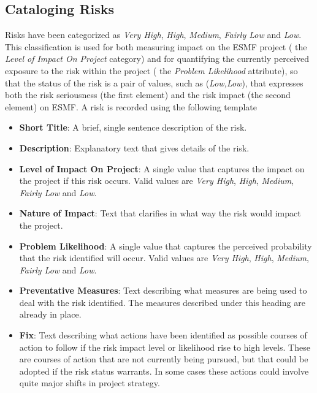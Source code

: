 \documentclass[english]{article}
\begin{document}
\subsection{Cataloging Risks}
Risks have been categorized as {\it Very High}, {\it High}, {\it Medium}, {\it Fairly Low} and {\it Low}.
This classification is used for both measuring impact on the ESMF project ( the {\it Level of Impact On Project} 
category) and for quantifying the currently perceived exposure to the risk within
the project ( the {\it Problem Likelihood} attribute), so that the
status of the risk is a pair of values, such as ({\it Low,Low}), that expresses
both the risk seriousness (the first element) and the risk impact (the second element) on
ESMF. A risk is recorded using the following template
\begin{itemize}
\item {\bf Short Title}: A brief, single sentence description of the risk.
\item {\bf Description}: Explanatory text that gives details of the risk.
\item {\bf Level of Impact On Project}: A single value that captures the impact on the project
if this risk occurs. Valid values are {\it Very High}, {\it High}, {\it Medium}, {\it Fairly Low} and
{\it Low}.
\item {\bf Nature of Impact}: Text that clarifies in what way the risk would impact the project.
\item {\bf Problem Likelihood}: A single value that captures the perceived probability that the risk
identified will occur. Valid values are {\it Very High}, {\it High}, {\it Medium}, {\it Fairly Low} and
{\it Low}.
\item {\bf Preventative Measures}: Text describing what measures are being used to deal with the
risk identified. The measures described under this heading are already in place.
\item {\bf Fix}: Text describing what actions have been identified as possible courses of action
to follow if the risk impact level or likelihood rise to high levels. These are courses of action 
that are not currently being pursued, but that could be adopted if the risk status warrants.
In some cases these actions could involve quite major shifts in project strategy.
\end{itemize}
\end{document}
